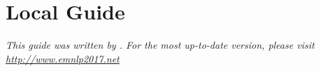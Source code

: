 \chapter{Local Guide}

\emph{This guide was written by . For the most up-to-date
  version, please visit
  \url{http://www.emnlp2017.net}}

\begin{center}
\end{center}

